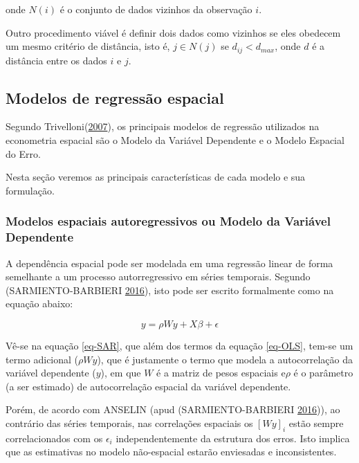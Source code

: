 \documentclass[12pt,]{article}
\begin{document}
onde \(N(i)\) é o conjunto de dados vizinhos da observação \(i\).

Outro procedimento viável é definir dois dados como vizinhos se eles
obedecem um mesmo critério de distância, isto é, \(j \in N(j)\) se
\(d_{ij} < d_{max}\), onde \(d\) é a distância entre os dados \(i\) e
\(j\).

\subsection{Modelos de regressão
espacial}\label{modelos-de-regressao-espacial}

Segundo Trivelloni(\protect\hyperlink{ref-trivelloni07}{2007}), os
principais modelos de regressão utilizados na econometria espacial são o
Modelo da Variável Dependente e o Modelo Espacial do Erro.

Nesta seção veremos as principais características de cada modelo e sua
formulação.

\subsubsection{Modelos espaciais autoregressivos ou Modelo da Variável
Dependente}\label{modelos-espaciais-autoregressivos-ou-modelo-da-variavel-dependente}

A dependência espacial pode ser modelada em uma regressão linear de
forma semelhante a um processo autorregressivo em séries temporais.
Segundo (SARMIENTO-BARBIERI
\protect\hyperlink{ref-sarmiento-barbieri}{2016}), isto pode ser escrito
formalmente como na equação abaixo:

\begin{equation}
  \label{eq-SAR}
  y = \rho Wy + X \beta + \epsilon
\end{equation}

Vê-se na equação \ref{eq-SAR}, que além dos termos da equação
\ref{eq-OLS}, tem-se um termo adicional (\(\rho Wy\)), que é justamente
o termo que modela a autocorrelação da variável dependente (\(y\)), em
que \(W\) é a matriz de pesos espaciais e\(\rho\) é o parâmetro (a ser
estimado) de autocorrelação espacial da variável dependente.

Porém, de acordo com ANSELIN (apud (SARMIENTO-BARBIERI
\protect\hyperlink{ref-sarmiento-barbieri}{2016})), ao contrário das
séries temporais, nas correlações espaciais os \([Wy]_i\) estão sempre
correlacionados com os \(\epsilon_i\) independentemente da estrutura dos
erros. Isto implica que as estimativas no modelo não-espacial estarão
enviesadas e inconsistentes.
\end{document}
